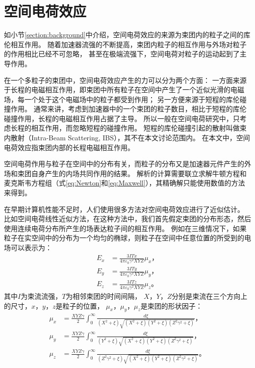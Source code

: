 \section{空间电荷效应}
\label{section:spaceChargeIntro}
如小节\eqref{section:background}中介绍，空间电荷效应的来源为束团内的粒子之间的库伦相互作用。
随着加速器流强的不断提高，束团内粒子的相互作用与外场对粒子的作用相比已经不可忽略，
甚至在极端流强下，空间电荷对粒子的运动起到了主导作用。

在一个多粒子的束团中，空间电荷效应产生的力可以分为两个方面：
一方面来源于长程的电磁相互作用，即束团中所有粒子在空间中产生了一个近似光滑的电磁场，每一个处于这个电磁场中的粒子都受到作用；
另一方便来源于短程的库伦碰撞作用。
通常来讲，考虑到加速器中的一个束团的粒子数目，相比于短程的库伦碰撞作用，长程的电磁相互作用占据了主导。
所以一般在空间电荷研究中，只考虑长程的相互作用，而忽略短程的碰撞作用。
短程的库伦碰撞引起的散射叫做束内散射（Intra-Beam Scattering, IBS），其不在本文讨论范围内。
在本文中，空间电荷效应指束团内部的长程电磁相互作用。

空间电荷作用与粒子在空间中的分布有关，而粒子的分布又是加速器元件产生的外场和束团自身产生的内场共同作用的结果。
解析的计算需要联立求解牛顿方程和麦克斯韦方程组（式\eqref{eq:Newton}和\eqref{eq:Maxwell}），其精确解只能使用数值的方法来得到。

在早期计算机性能不足时，人们使用很多方法对空间电荷效应进行了近似估计。
比如空间电荷线性近似方法，在这种方法中，我们首先假定束团的分布形态，然后使用连续电荷分布所产生的场表达粒子间的相互作用。
例如在三维情况下，如果粒子在实空间中的分布为一个均匀的椭球，则粒子在空间中任意位置的所受到的电场可以表示为\cite{lv2004beamoptic}：
\begin{equation}
    \label{eq:SpaceCharge3D}
    \begin{aligned}
    E_x &= \frac{3ITx}{4 \pi {\varepsilon}_{0} {\gamma}^2 XYZ}{\mu}_x \text{，} \\
    E_y &= \frac{3ITy}{4 \pi {\varepsilon}_{0} {\gamma}^2 XYZ}{\mu}_y \text{，} \\
    E_z &= \frac{3ITz}{4 \pi {\varepsilon}_{0} {\gamma}^2 XYZ}{\mu}_z \text{。}
    \end{aligned}
\end{equation}
其中$I$为束流流强，$T$为相邻束团的时间间隔，
$X$，$Y$，$Z$分别是束流在三个方向上的尺寸，$x$，$y$，$z$是粒子的位置，
${\mu}_x$，${\mu}_y$，${\mu}_z$是束团的形状因子：
\begin{equation}
    \label{eq:SpaceCharge3D_mu}
    \begin{aligned}
    {\mu}_x &= \frac{XYZ\gamma}{2}   \int_0^{\infty}
    \frac{d\xi}{(X^2+\xi)            \sqrt{(X^2+\xi)(Y^2+\xi)(Z^2 {\gamma}^2+\xi)}} \text{，}  \\
    {\mu}_y &= \frac{XYZ\gamma}{2}   \int_0^{\infty}
    \frac{d\xi}{(Y^2+\xi)            \sqrt{(X^2+\xi)(Y^2+\xi)(Z^2 {\gamma}^2+\xi)}} \text{，} \\
    {\mu}_z &= \frac{XYZ\gamma}{2}   \int_0^{\infty}
    \frac{d\xi}{(Z^2 {\gamma}^2+\xi) \sqrt{(X^2+\xi)(Y^2+\xi)(Z^2 {\gamma}^2+\xi)}} \text{。} \\
    \end{aligned}
\end{equation}

